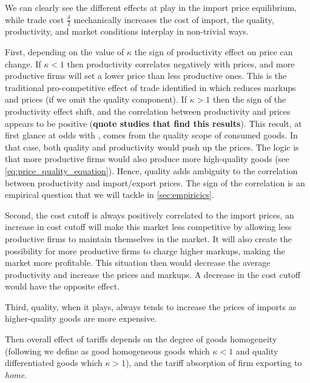 {We can clearly see the different effects at play in the import price equilibrium, while trade cost $\frac{\delta}{2}$ mechanically increases the cost of import, the quality, productivity, and market conditions interplay in non-trivial ways. 

First, depending on the value of $\kappa$ the sign of productivity effect on price can change. If $\kappa <1$ then productivity correlates negatively with prices, and more productive firms will set a lower price than less productive ones. This is the traditional pro-competitive effect of trade identified in \citet{melitzMarketSizeTrade2008} which reduces markups and prices (if we omit the quality component). If $\kappa > 1$ then the sign of the productivity effect shift, and the correlation between productivity and prices appears to be positive (\textbf{quote studies that find this results}). This result, at first glance at odds with \citet{melitzMarketSizeTrade2008}, comes from the quality scope of consumed goods. In that case, both quality and productivity would push up the prices. The logic is that more productive firms would also produce more high-quality goods (see \eqref{eq:price_quality_equation}). Hence, quality adds ambiguity to the correlation between productivity and import/export prices. The sign of the correlation is an empirical question that we will tackle in \autoref{sec:empiricics}. 

Second, the cost cutoff is always positively correlated to the import prices, an increase in cost cutoff will make this market less competitive by allowing less productive firms to maintain themselves in the market. It will also create the possibility for more productive firms to charge higher markups, making the market more profitable. This situation then would decrease the average productivity and increase the prices and markups. A decrease in the cost cutoff would have the opposite effect.

Third, quality, when it plays, always tends to increase the prices of imports as higher-quality goods are more expensive. 

Then overall effect of tariffs depends on the degree of goods homogeneity (following \citet{ludemaTariffPassthroughFirm2016} we define as good homogeneous goods which $\kappa <1$ and quality differentiated goods which $\kappa > 1$), and the tariff absorption of firm exporting to \textit{home}. 


}
